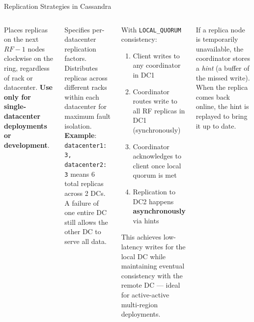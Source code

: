 \documentclass[aspectratio=169]{beamer}
\begin{document}
\begin{frame}{Replication Strategies in Cassandra}
  \small
  \begin{columns}[T]
      \begin{tcolorbox}[cassbox, title=SimpleStrategy]
        \scriptsize
        Places replicas on the next $RF-1$ nodes clockwise on the ring, regardless of rack or datacenter. \textbf{Use only for single-datacenter deployments or development}.
      \end{tcolorbox}
      \vspace{0.2cm}
      \begin{tcolorbox}[cassbox, title=NetworkTopologyStrategy (Production)]
        \scriptsize
        Specifies per-datacenter replication factors. Distributes replicas across different racks within each datacenter for maximum fault isolation.
        \vspace{0.1cm}\\
        \textbf{Example}: \texttt{datacenter1: 3, datacenter2: 3} means 6 total replicas across 2 DCs. A failure of one entire DC still allows the other DC to serve all data.
      \end{tcolorbox}
      \begin{tcolorbox}[deepdivebox, title={Deep Dive: Multi-DC Write Path}]
        \scriptsize
        With \texttt{LOCAL\_QUORUM} consistency:
        \begin{enumerate}
          \item Client writes to any coordinator in DC1
          \item Coordinator routes write to all RF replicas in DC1 (synchronously)
          \item Coordinator acknowledges to client once local quorum is met
          \item Replication to DC2 happens \textbf{asynchronously} via hints
        \end{enumerate}
        This achieves low-latency writes for the local DC while maintaining eventual consistency with the remote DC — ideal for active-active multi-region deployments.
      \end{tcolorbox}
      \vspace{0.2cm}
      \begin{tcolorbox}[infobox, title=Hinted Handoff]
        \scriptsize
        If a replica node is temporarily unavailable, the coordinator stores a \textit{hint} (a buffer of the missed write). When the replica comes back online, the hint is replayed to bring it up to date.
      \end{tcolorbox}
  \end{columns}
\end{frame}
\end{document}
